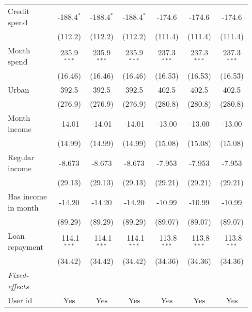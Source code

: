 \begin{table}[htbp]
\begin{threeparttable}[b]
\begin{tabular}{lcccccc}
         Credit spend        & -188.4$^{*}$   & -188.4$^{*}$   & -188.4$^{*}$   & -174.6         & -174.6         & -174.6\\   
                             & (112.2)        & (112.2)        & (112.2)        & (111.4)        & (111.4)        & (111.4)\\   
         Month spend         & 235.9$^{***}$  & 235.9$^{***}$  & 235.9$^{***}$  & 237.3$^{***}$  & 237.3$^{***}$  & 237.3$^{***}$\\   
                             & (16.46)        & (16.46)        & (16.46)        & (16.53)        & (16.53)        & (16.53)\\   
         Urban               & 392.5          & 392.5          & 392.5          & 402.5          & 402.5          & 402.5\\   
                             & (276.9)        & (276.9)        & (276.9)        & (280.8)        & (280.8)        & (280.8)\\   
         Month income        & -14.01         & -14.01         & -14.01         & -13.00         & -13.00         & -13.00\\   
                             & (14.99)        & (14.99)        & (14.99)        & (15.08)        & (15.08)        & (15.08)\\   
         Regular income      & -8.673         & -8.673         & -8.673         & -7.953         & -7.953         & -7.953\\   
                             & (29.13)        & (29.13)        & (29.13)        & (29.21)        & (29.21)        & (29.21)\\   
         Has income in month & -14.20         & -14.20         & -14.20         & -10.99         & -10.99         & -10.99\\   
                             & (89.29)        & (89.29)        & (89.29)        & (89.07)        & (89.07)        & (89.07)\\   
         Loan repayment      & -114.1$^{***}$ & -114.1$^{***}$ & -114.1$^{***}$ & -113.8$^{***}$ & -113.8$^{***}$ & -113.8$^{***}$\\   
                             & (34.42)        & (34.42)        & (34.42)        & (34.36)        & (34.36)        & (34.36)\\   
         \midrule
         \emph{Fixed-effects}\\
         User id             & Yes            & Yes            & Yes            & Yes            & Yes            & Yes\\  

\end{tabular}
\end{threeparttable}
\end{table}
